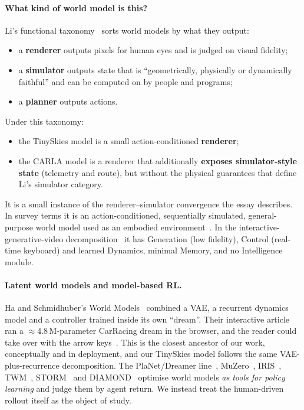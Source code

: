 \documentclass[11pt]{article}
\begin{document}
\paragraph{What kind of world model is this?} Li's functional taxonomy~\cite{li2026taxonomy} sorts world models by what they output:
\begin{itemize}
  \item a \textbf{renderer} outputs pixels for human eyes and is judged on visual fidelity;
  \item a \textbf{simulator} outputs state that is ``geometrically, physically or dynamically faithful'' and can be computed on by people and programs;
  \item a \textbf{planner} outputs actions.
\end{itemize}
Under this taxonomy:
\begin{itemize}
  \item the TinySkies model is a small action-conditioned \textbf{renderer};
  \item the CARLA model is a renderer that additionally \textbf{exposes simulator-style state} (telemetry and route), but without the physical guarantees that define Li's simulator category.
\end{itemize}
It is a small instance of the renderer--simulator convergence the essay describes. In survey terms it is an action-conditioned, sequentially simulated, general-purpose world model used as an embodied environment~\cite{ding2024survey,li2025embodied}. In the interactive-generative-video decomposition~\cite{yu2025igv} it has Generation (low fidelity), Control (real-time keyboard) and learned Dynamics, minimal Memory, and no Intelligence module.

\paragraph{Latent world models and model-based RL.} Ha and Schmidhuber's World Models~\cite{ha2018worldmodels} combined a VAE, a recurrent dynamics model and a controller trained inside its own ``dream''. Their interactive article ran a $\approx$4.8\,M-parameter CarRacing dream in the browser, and the reader could take over with the arrow keys~\cite{ha2018interactive}. This is the closest ancestor of our work, conceptually and in deployment, and our TinySkies model follows the same VAE-plus-recurrence decomposition. The PlaNet/Dreamer line~\cite{hafner2025dreamerv3,hafner2019planet,hafner2020dreamer}, MuZero~\cite{schrittwieser2020muzero}, IRIS~\cite{micheli2023iris}, TWM~\cite{robine2023twm}, STORM~\cite{zhang2023storm} and DIAMOND~\cite{alonso2024diamond} optimise world models \emph{as tools for policy learning} and judge them by agent return. We instead treat the human-driven rollout itself as the object of study.
\end{document}
